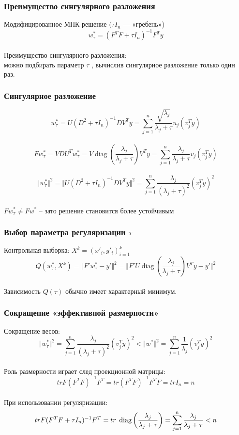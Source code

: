 \documentclass[12pt, aspectratio=169]{beamer}
\begin{document}
\begin{frame}\frametitle{Преимущество сингулярного разложения}
Модифицированное МНК-решение ($\tau I_n$ — «гребень»)\\
$$w^*_{\tau} = (F^TF + \tau I_n)^{-1}F^Ty$$\\
Преимущество сингулярного разложения:\\
можно подбирать параметр $\tau$ , вычислив сингулярное разложение только один раз.
\end{frame}

\begin{frame}\frametitle{Сингулярное разложение}
$$w_{\tau}^*= U(D^2 + \tau I_n)^{-1}DV^Ty = \sum\limits_{j=1}^n \frac{\sqrt{\lambda_j}}{\lambda_j + \tau} u_j(v_j^Ty)$$\\
$$Fw_{\tau}^* = VDU^Tw_{\tau}^* = V \operatorname{diag} \left(\frac{\lambda_j}{\lambda_j + \tau}\right) V^Ty = \sum\limits_{j=1}^n \frac{\lambda_j}{\lambda_j + \tau} v_j (v_j^Ty)$$\\
$$\Vert w_{\tau}^* \Vert^2 = \Vert U(D^2 + \tau I_n)^{-1} DV^T y \Vert^2 = \sum\limits_{j=1}^n \frac{\lambda_j}{(\lambda_j + \tau)^2} (v^T_j y)^2$$\\
$F w_{\tau}^* \neq Fw^*$ -- зато решение становится более устойчивым
\end{frame}

\begin{frame}\frametitle{Выбор параметра регуляризации $\tau$}
Контрольная выборка: $X^k = (x'_i, y'_i)_{i=1}^k$\\
$$Q(w_{\tau}^*,X^k) = \Vert F' w_{\tau}^* - y' \Vert^2 = \Vert F'U \operatorname{diag} \left(\frac{\lambda_j}{\lambda_j + \tau}\right) V^T y -y' \Vert^2$$\\
Зависимость $Q(\tau)$ обычно имеет характерный минимум.
\end{frame}

\begin{frame}\frametitle{Сокращение «эффективной размерности»}
Сокращение весов:\\
$$\Vert w_{\tau}^* \Vert^2 = \sum\limits_{j=1}^n \frac{\lambda_j}{(\lambda_j + \tau)^2} (v^T_j y)^2 < \Vert w^* \Vert^2  = \sum\limits_{j=1}^n \frac{1}{\lambda_j} (v_j^Ty)^2$$\\
Роль размерности играет след проекционной матрицы:\\
$$tr F(F^TF)^{-1}F^T = tr(F^TF)^{-1}F^TF = tr I_n = n$$\\
При использовании регуляризации:\\
$$tr F(F^TF + \tau I_n)^{-1}F^T = tr \hspace{1mm}  \operatorname{diag} \left(\frac{\lambda_j}{\lambda_j + \tau}\right)= \sum\limits_{j=1}^n \frac{\lambda_j}{\lambda_j + \tau } < n $$
\end{frame}
\end{document}
